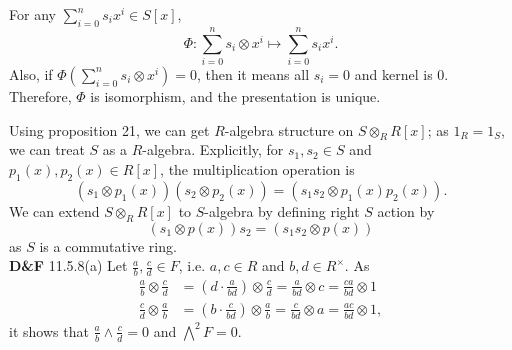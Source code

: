\documentclass[a4paper, 12pt]{article}
\theoremstyle{Mydefinition}
\theoremstyle{Mytheorem}
\begin{document}
For any $\sum_{i=0}^n s_ix^i\in S[x]$,
\begin{equation}
    \Phi:\sum_{i=0}^n s_i\otimes x^i\mapsto \sum_{i=0}^n s_ix^i.
\end{equation}
Also, if $\Phi\left(\sum_{i=0}^n s_i\otimes x^i\right) = 0$, then it means all $s_i=0$ and kernel is $0$. Therefore, $\Phi$ is isomorphism, and the presentation is unique.

Using proposition 21, we can get $R$-algebra structure on $S\otimes_R R[x]$; as $1_R=1_S$, we can treat $S$ as a $R$-algebra. Explicitly, for $s_1,s_2\in S$ and $p_1(x),p_2(x)\in R[x]$, the multiplication operation is
\begin{equation}
       (s_1\otimes p_1(x))(s_2\otimes p_2(x)) = (s_1s_2\otimes p_1(x)p_2(x)).
\end{equation}
We can extend $S\otimes_R R[x]$ to $S$-algebra by defining right $S$ action by
\begin{equation}
    (s_1\otimes p(x))s_2 = (s_1s_2\otimes p(x))
\end{equation}
as $S$ is a commutative ring.\\

\noindent \textbf{D\&F} 11.5.8(a)
Let $\frac{a}{b},\frac{c}{d}\in F$, i.e. $a,c\in R$ and $b,d\in R^\times$. As
\begin{equation}
    \begin{split}
        \frac{a}{b}\otimes \frac{c}{d} &= \left(d\cdot \frac{a}{bd}\right)\otimes\frac{c}{d} =\frac{a}{bd} \otimes c = \frac{ca}{bd}\otimes 1\\
        \frac{c}{d}\otimes \frac{a}{b} &= \left(b\cdot \frac{c}{bd}\right)\otimes\frac{a}{b} =\frac{c}{bd} \otimes a = \frac{ac}{bd}\otimes 1,
    \end{split}
\end{equation}
it shows that $\frac{a}{b}\wedge \frac{c}{d} = 0$ and $\bigwedge^2 F = 0$.\\
\end{document}
